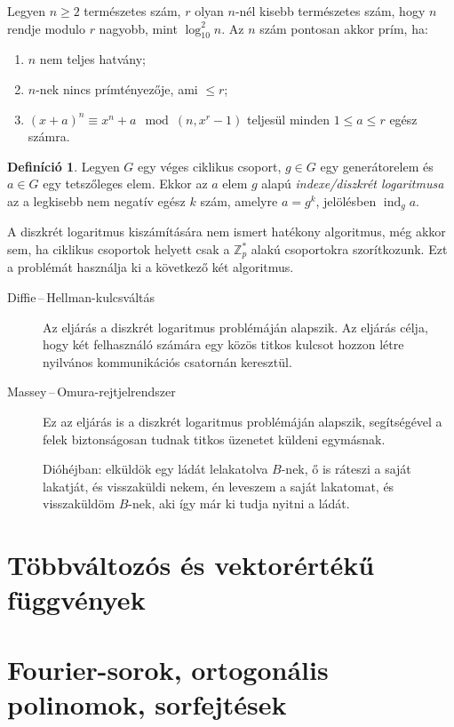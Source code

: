 \documentclass[DIV=15,appendixprefix]{scrreprt}
\theoremstyle{definition}
\newtheorem*{defin}{Definíció}
\theoremstyle{remark}
\DeclareMathOperator{\ind}{ind}
\begin{document}
\begin{description}
		Legyen $ n \ge 2 $ természetes szám, $ r $ olyan $ n $-nél kisebb természetes szám, hogy
		$ n $ rendje modulo $ r $ nagyobb, mint $ \log_{ 10 }^{ 2 } n $. Az $ n $ szám pontosan
		akkor prím, ha:
		\begin{enumerate}
		\item $ n $ nem teljes hatvány;
		\item $ n $-nek nincs prímtényezője, ami $ \le r $;
		\item $ \left( x + a \right)^{ n } \equiv x^{ n } + a \mod{ \left( n, x^{ r } - 1
			\right) } $ teljesül minden $ 1 \le a \le r $ egész számra.
		\end{enumerate}
\end{description}
%
\begin{defin}
	Legyen $G$ egy véges ciklikus csoport, $ g \in G $ egy generátorelem és $ a \in G $ egy
	tetszőleges elem. Ekkor az $ a $ elem $ g $ alapú \emph{indexe/diszkrét logaritmusa} az a
	legkisebb nem negatív egész $ k $ szám, amelyre $ a = g^{ k }$, jelölésben $ \ind_{ g } a $.
\end{defin}
A diszkrét logaritmus kiszámítására nem ismert hatékony algoritmus, még akkor sem, ha ciklikus
csoportok helyett csak a $ \mathbb{ Z }_{ p }^{ * } $ alakú csoportokra szorítkozunk. Ezt a
problémát használja ki a következő két algoritmus.
\begin{description}
	\item[Diffie\,--\,Hellman-kulcsváltás] Az eljárás a diszkrét logaritmus problémáján alapszik. Az
		eljárás célja, hogy két felhasználó számára egy közös titkos kulcsot hozzon létre nyilvános
		kommunikációs csatornán keresztül.

	\item[Massey\,--\,Omura-rejtjelrendszer] Ez az eljárás is a diszkrét logaritmus problémáján
		alapszik, segítségével a felek biztonságosan tudnak titkos üzenetet küldeni egymásnak.

		Dióhéjban: elküldök egy ládát lelakatolva $ B $-nek, ő is ráteszi a saját lakatját,
		és visszaküldi nekem, én leveszem a saját lakatomat, és visszaküldöm $ B $-nek, aki így
		már ki tudja nyitni a ládát.
\end{description}
%
\section{Többváltozós és vektorértékű függvények}
%
\section{Fourier-sorok, ortogonális polinomok, sorfejtések}
%
\end{document}
